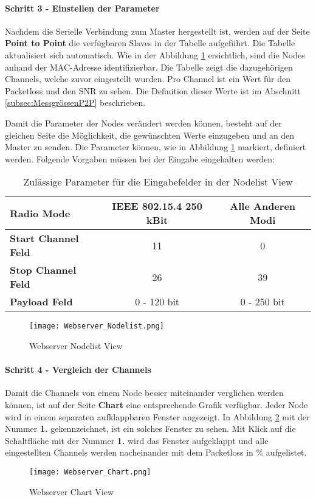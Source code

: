 \paragraph{Schritt 3 - Einstellen der Parameter}
Nachdem die Serielle Verbindung zum Master hergestellt ist, werden auf der Seite \textbf{Point to Point} die verfügbaren Slaves in der Tabelle aufgeführt. Die Tabelle aktualisiert sich automatisch. Wie in der Abbildung \ref{fig:WebserverNodelistView} ersichtlich, sind die Nodes anhand der MAC-Adresse identifizierbar. Die Tabelle zeigt die dazugehörigen Channels, welche zuvor eingestellt wurden. Pro Channel ist ein Wert für den Packetloss und den SNR zu sehen. Die Definition dieser Werte ist im Abschnitt \ref{subsec:MessgrössenP2P} beschrieben. 

Damit die Parameter der Nodes verändert werden können, besteht auf der gleichen Seite die Möglichkeit, die gewünschten Werte einzugeben und an den Master zu senden. Die Parameter können, wie in Abbildung \ref{fig:WebserverNodelistView} markiert, definiert werden. Folgende Vorgaben müssen bei der Eingabe eingehalten werden:

\begin{table}[h]
\centering
\begin{tabular}{|l|c|c|} 
\hline
\textbf{Radio Mode} & \textbf{IEEE 802.15.4 250 kBit}  & \textbf{Alle Anderen Modi}  \\ 
\hline
\textbf{Start Channel Feld} & 11 & 0 \\ 
\hline
\textbf{Stop Channel Feld} & 26 & 39 \\ 
\hline
\textbf{Payload Feld} & 0 - 120 bit & 0 - 250 bit \\
\hline
\end{tabular}
\caption{Zulässige Parameter für die Eingabefelder in der Nodelist View}
\label{tab:ParameterEingabefelederNodelistView}
\end{table}


\begin{figure} [H]
	\centering
	\texttt{[image: Webserver\_Nodelist.png]}
	\caption{Webserver Nodelist View}
	\label{fig:WebserverNodelistView}
\end{figure}

\paragraph{Schritt 4 - Vergleich der Channels}
Damit die Channels von einem Node besser miteinander verglichen werden können, ist auf der Seite \textbf{Chart} eine entsprechende Grafik verfügbar.
Jeder Node wird in einem separaten aufklappbaren Fenster angezeigt.
In Abbildung \ref{fig:WebserverChartView} mit der Nummer \textbf{1.} gekennzeichnet, ist ein solches Fenster zu sehen.
Mit Klick auf die Schaltfläche mit der Nummer \textbf{1.} wird das Fenster aufgeklappt und alle eingestellten Channels werden nacheinander mit dem Packetloss in \% aufgelistet.
\begin{figure} [H]
	\centering
	\texttt{[image: Webserver\_Chart.png]}
	\caption{Webserver Chart View}
	\label{fig:WebserverChartView}
\end{figure}

